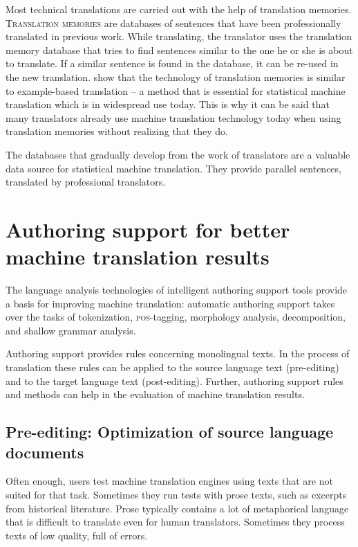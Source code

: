 \documentclass[output=paper]{LSP/langsci}
\begin{document}
Most technical translations are carried out with the help of translation memories. \textsc{Translation memories} are databases of sentences that have been professionally translated in previous work. While translating, the translator uses the translation memory database that tries to find sentences similar to the one he or she is about to translate. If a similar sentence is found in the database, it can be re-used in the new translation. \citet{Somers2004} show that the technology of translation memories is similar to example-based translation -- a method that is essential for statistical machine translation which is in widespread use today. This is why it can be said that many translators already use machine translation technology today when using translation memories without realizing that they do. 

The databases that gradually develop from the work of translators are a valuable data source for statistical machine translation. They provide parallel sentences, translated by professional translators. 

\section{Authoring support for better machine translation results}\label{sec:siegel:4}

The language analysis technologies of intelligent authoring support tools provide a basis for improving machine translation: automatic authoring support takes over the tasks of tokenization, \textsc{pos}-tagging, morphology analysis, decomposition, and shallow grammar analysis.

Authoring support provides rules concerning monolingual texts. In the process of translation these rules can be applied to the source language text (pre-editing) and to the target language text (post-editing). Further, authoring support rules and methods can help in the evaluation of machine translation results.

\subsection{Pre-editing: Optimization of source language documents}\label{sec:siegel:4.1}
\largerpage
Often enough, users test machine translation engines using texts that are not suited for that task. Sometimes they run tests with prose texts, such as excerpts from historical literature. Prose typically contains a lot of metaphorical language that is difficult to translate even for human translators. Sometimes they process texts of low quality, full of errors.
\end{document}
